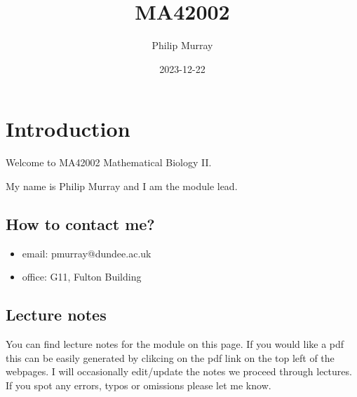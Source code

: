 \documentclass[
  letterpaper,
  DIV=11,
  numbers=noendperiod]{scrreprt}
\title{MA42002}
\author{Philip Murray}
\date{2023-12-22}
\providecommand{\tightlist}{%
  \setlength{\itemsep}{0pt}\setlength{\parskip}{0pt}}\usepackage{longtable,booktabs,array}
\renewcommand*\contentsname{Table of contents}
\newcommand\contentsname{Table of contents}
\theoremstyle{definition}
\theoremstyle{plain}
\theoremstyle{plain}
\theoremstyle{remark}
\begin{document}
\maketitle
\ifdefined\Shaded\renewenvironment{Shaded}{\begin{tcolorbox}[interior hidden, boxrule=0pt, frame hidden, borderline west={3pt}{0pt}{shadecolor}, sharp corners, enhanced, breakable]}{\end{tcolorbox}}\fi

\renewcommand*\contentsname{Table of contents}
{
\hypersetup{linkcolor=}
\setcounter{tocdepth}{2}
\tableofcontents
}

\hypertarget{introduction}{%
\chapter*{Introduction}\label{introduction}}


Welcome to MA42002 Mathematical Biology II.

My name is Philip Murray and I am the module lead.

\hypertarget{how-to-contact-me}{%
\section*{How to contact me?}\label{how-to-contact-me}}


\begin{itemize}
\tightlist
\item
  email: pmurray@dundee.ac.uk
\item
  office: G11, Fulton Building
\end{itemize}

\hypertarget{lecture-notes}{%
\section*{Lecture notes}\label{lecture-notes}}


You can find lecture notes for the module on this page. If you would
like a pdf this can be easily generated by clikcing on the pdf link on
the top left of the webpages. I will occasionally edit/update the notes
we proceed through lectures. If you spot any errors, typos or omissions
please let me know.
\end{document}
